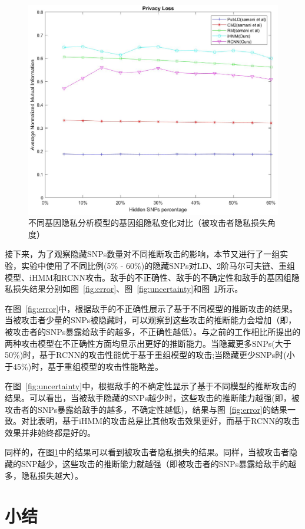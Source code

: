 \begin{figure}[htbp]
	\centering
	\includegraphics[width =0.8\linewidth]{./figures/Fig7-genomic-privacy-quantifying-privacyloss.eps}
	\caption{不同基因隐私分析模型的基因组隐私变化对比（被攻击者隐私损失角度）}
	\label{fig:privacyloss}
\end{figure}

接下来，为了观察隐藏SNPs数量对不同推断攻击的影响，本节又进行了一组实验，实验中使用了不同比例(5\% - 60\%)的隐藏SNPs对LD、2阶马尔可夫链、重组模型、iHMM和RCNN攻击。敌手的不正确性、敌手的不确定性和敌手的基因组隐私损失结果分别如图~\ref{fig:error}、图~\ref{fig:uncertainty}和图~\ref{fig:privacyloss}所示。

在图~\ref{fig:error}中，根据敌手的不正确性展示了基于不同模型的推断攻击的结果。当被攻击者少量的SNPs被隐藏时，可以观察到这些攻击的推断能力会增加（即，被攻击者的SNPs暴露给敌手的越多，不正确性越低）。与之前的工作相比所提出的两种攻击模型在不正确性方面均显示出更好的推断能力。当隐藏更多SNPs(大于50\%)时，基于RCNN的攻击性能优于基于重组模型的攻击;当隐藏更少SNPs时(小于45\%)时，基于重组模型的攻击性能略差。

在图~\ref{fig:uncertainty}中，根据敌手的不确定性显示了基于不同模型的推断攻击的结果。可以看出，当被敌手隐藏的SNPs越少时，这些攻击的推断能力越强(即，被攻击者的SNPs暴露给敌手的越多，不确定性越低)，结果与图~\ref{fig:error}的结果一致。对比表明，基于iHMM的攻击总是比其他攻击效果更好，而基于RCNN的攻击效果并非始终都是好的。

同样的，在图\ref{fig:privacyloss}中的结果可以看到被攻击者隐私损失的结果。同样，当被攻击者隐藏的SNP越少，这些攻击的推断能力就越强（即被攻击者的SNPs暴露给敌手的越多，隐私损失越大）。

\section{小结}\label{sec:concl}

